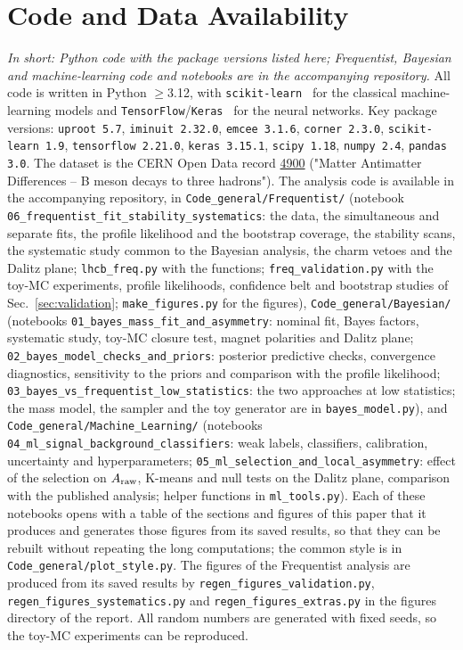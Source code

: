 \section{Code and Data Availability}
\label{sec:code}
\emph{In short: Python code with the package versions listed here; Frequentist, Bayesian and machine-learning code and notebooks are in the accompanying repository.}
All code is written in Python $\geq$3.12, with \texttt{scikit-learn}~\cite{sklearn} for the classical machine-learning models and \texttt{TensorFlow}/\texttt{Keras}~\cite{tensorflow} for the neural networks. Key package versions: \texttt{uproot 5.7}, \texttt{iminuit 2.32.0}, \texttt{emcee 3.1.6}, \texttt{corner 2.3.0}, \texttt{scikit-learn 1.9}, \texttt{tensorflow 2.21.0}, \texttt{keras 3.15.1}, \texttt{scipy 1.18}, \texttt{numpy 2.4}, \texttt{pandas 3.0}.
The dataset is the CERN Open Data record \href{https://opendata.cern.ch/record/4900}{4900} ("Matter Antimatter Differences -- B meson decays to three hadrons"). The analysis code is available in the accompanying repository, in \texttt{Code\_general/Frequentist/} (notebook \texttt{06\_frequentist\_fit\_stability\_systematics}: the data, the simultaneous and separate fits, the profile likelihood and the bootstrap coverage, the stability scans, the systematic study common to the Bayesian analysis, the charm vetoes and the Dalitz plane; \texttt{lhcb\_freq.py} with the functions; \texttt{freq\_validation.py} with the toy-MC experiments, profile likelihoods, confidence belt and bootstrap studies of Sec.~\ref{sec:validation}; \texttt{make\_figures.py} for the figures), \texttt{Code\_general/Bayesian/} (notebooks \texttt{01\_bayes\_mass\_fit\_and\_asymmetry}: nominal fit, Bayes factors, systematic study, toy-MC closure test, magnet polarities and Dalitz plane; \texttt{02\_bayes\_model\_checks\_and\_priors}: posterior predictive checks, convergence diagnostics, sensitivity to the priors and comparison with the profile likelihood; \texttt{03\_bayes\_vs\_frequentist\_low\_statistics}: the two approaches at low statistics; the mass model, the sampler and the toy generator are in \texttt{bayes\_model.py}), and \texttt{Code\_general/Machine\_Learning/} (notebooks \texttt{04\_ml\_signal\_background\_classifiers}: weak labels, classifiers, calibration, uncertainty and hyperparameters; \texttt{05\_ml\_selection\_and\_local\_asymmetry}: effect of the selection on $A_{\mathrm{raw}}$, K-means and null tests on the Dalitz plane, comparison with the published analysis; helper functions in \texttt{ml\_tools.py}). Each of these notebooks opens with a table of the sections and figures of this paper that it produces and generates those figures from its saved results, so that they can be rebuilt without repeating the long computations; the common style is in \texttt{Code\_general/plot\_style.py}. The figures of the Frequentist analysis are produced from its saved results by \texttt{regen\_figures\_validation.py}, \texttt{regen\_figures\_systematics.py} and \texttt{regen\_figures\_extras.py} in the figures directory of the report. All random numbers are generated with fixed seeds, so the toy-MC experiments can be reproduced.
